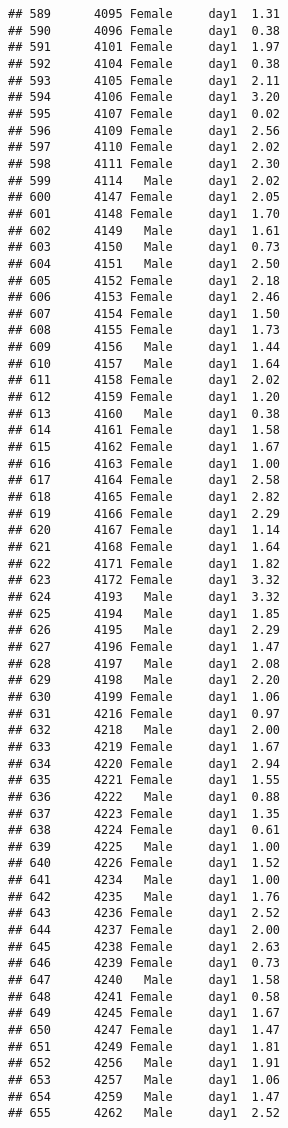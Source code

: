 \documentclass[
]{article}
\begin{document}
\begin{verbatim}
## 589      4095 Female     day1  1.31
## 590      4096 Female     day1  0.38
## 591      4101 Female     day1  1.97
## 592      4104 Female     day1  0.38
## 593      4105 Female     day1  2.11
## 594      4106 Female     day1  3.20
## 595      4107 Female     day1  0.02
## 596      4109 Female     day1  2.56
## 597      4110 Female     day1  2.02
## 598      4111 Female     day1  2.30
## 599      4114   Male     day1  2.02
## 600      4147 Female     day1  2.05
## 601      4148 Female     day1  1.70
## 602      4149   Male     day1  1.61
## 603      4150   Male     day1  0.73
## 604      4151   Male     day1  2.50
## 605      4152 Female     day1  2.18
## 606      4153 Female     day1  2.46
## 607      4154 Female     day1  1.50
## 608      4155 Female     day1  1.73
## 609      4156   Male     day1  1.44
## 610      4157   Male     day1  1.64
## 611      4158 Female     day1  2.02
## 612      4159 Female     day1  1.20
## 613      4160   Male     day1  0.38
## 614      4161 Female     day1  1.58
## 615      4162 Female     day1  1.67
## 616      4163 Female     day1  1.00
## 617      4164 Female     day1  2.58
## 618      4165 Female     day1  2.82
## 619      4166 Female     day1  2.29
## 620      4167 Female     day1  1.14
## 621      4168 Female     day1  1.64
## 622      4171 Female     day1  1.82
## 623      4172 Female     day1  3.32
## 624      4193   Male     day1  3.32
## 625      4194   Male     day1  1.85
## 626      4195   Male     day1  2.29
## 627      4196 Female     day1  1.47
## 628      4197   Male     day1  2.08
## 629      4198   Male     day1  2.20
## 630      4199 Female     day1  1.06
## 631      4216 Female     day1  0.97
## 632      4218   Male     day1  2.00
## 633      4219 Female     day1  1.67
## 634      4220 Female     day1  2.94
## 635      4221 Female     day1  1.55
## 636      4222   Male     day1  0.88
## 637      4223 Female     day1  1.35
## 638      4224 Female     day1  0.61
## 639      4225   Male     day1  1.00
## 640      4226 Female     day1  1.52
## 641      4234   Male     day1  1.00
## 642      4235   Male     day1  1.76
## 643      4236 Female     day1  2.52
## 644      4237 Female     day1  2.00
## 645      4238 Female     day1  2.63
## 646      4239 Female     day1  0.73
## 647      4240   Male     day1  1.58
## 648      4241 Female     day1  0.58
## 649      4245 Female     day1  1.67
## 650      4247 Female     day1  1.47
## 651      4249 Female     day1  1.81
## 652      4256   Male     day1  1.91
## 653      4257   Male     day1  1.06
## 654      4259   Male     day1  1.47
## 655      4262   Male     day1  2.52

\end{verbatim}
\end{document}
